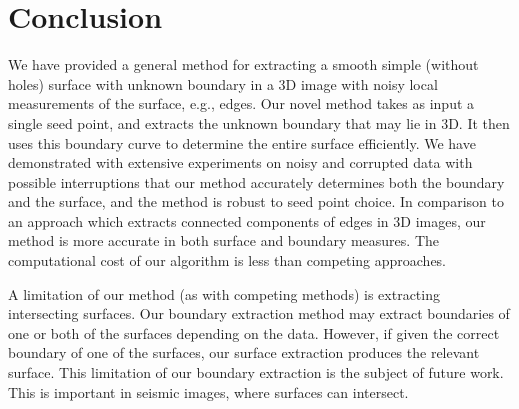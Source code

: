 \documentclass[10pt,journal,compsoc]{IEEEtran}
\begin{document}
\section{Conclusion}
We have provided a general method for extracting a smooth simple
(without holes) surface with unknown boundary in a 3D image with noisy
local measurements of the surface, e.g., edges. Our novel method takes
as input a single seed point, and extracts the unknown boundary that
may lie in 3D. It then uses this boundary curve to determine the
entire surface efficiently. We have demonstrated with extensive
experiments on noisy and corrupted data with possible interruptions
that our method accurately determines both the boundary and the
surface, and the method is robust to seed point choice. In comparison
to an approach which extracts connected components of edges in 3D
images, our method is more accurate in both surface and boundary
measures. The computational cost of our algorithm is less than
competing approaches.

A limitation of our method (as with competing methods) is extracting
intersecting surfaces. Our boundary extraction method may extract
boundaries of one or both of the surfaces depending on the
data. However, if given the correct boundary of one of the surfaces,
our surface extraction produces the relevant surface. This limitation
of our boundary extraction is the subject of future work. This is
important in seismic images, where surfaces can intersect.


%
\end{document}
